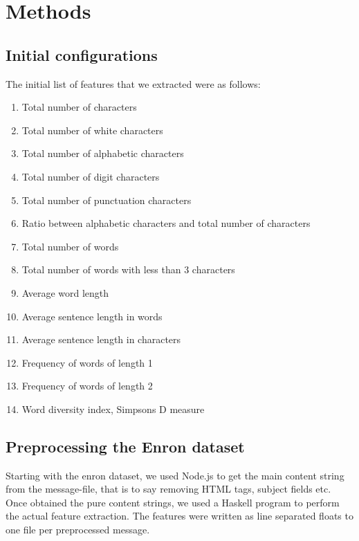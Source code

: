
\section{Methods}

  \subsection{Initial configurations}

    The initial list of features that we extracted were as follows:
    \begin{enumerate}
      \item Total number of characters
      \item Total number of white characters 
      \item Total number of alphabetic characters
      \item Total number of digit characters
      \item Total number of punctuation characters
      \item Ratio between alphabetic characters and total number of characters
      \item Total number of words
      \item Total number of words with less than 3 characters
      \item Average word length 
      \item Average sentence length in words
      \item Average sentence length in characters
      \item Frequency of words of length 1
      \item Frequency of words of length 2
      \item Word diversity index, Simpsons D measure \cite{simpsons-measure}
    \end{enumerate}
    
    \subsection{Preprocessing the Enron dataset}

    Starting with the enron dataset, we used Node.js to get the main content
    string from the message-file, that is to say removing HTML tags, subject
    fields etc. Once obtained the pure content strings, we used a Haskell
    program to perform the actual feature extraction. The features were written
    as line separated floats to one file per preprocessed message.

